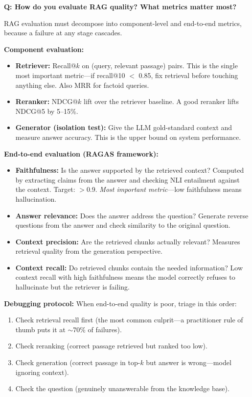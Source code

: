 \begin{interviewq}
\textbf{Q: How do you evaluate RAG quality? What metrics matter most?}

 \quad {} \quad \badgefreq{\freqhigh}

\stronganswer

RAG evaluation must decompose into component-level and end-to-end metrics, because a failure at any stage cascades.

\textbf{Component evaluation:}
\begin{itemize}
    \item \textbf{Retriever:} Recall@$k$ on (query, relevant passage) pairs. This is the single most important metric---if recall@10 $<$ 0.85, fix retrieval before touching anything else. Also MRR for factoid queries.
    \item \textbf{Reranker:} NDCG@$k$ lift over the retriever baseline. A good reranker lifts NDCG@5 by 5--15\%.
    \item \textbf{Generator (isolation test):} Give the LLM gold-standard context and measure answer accuracy. This is the upper bound on system performance.
\end{itemize}

\textbf{End-to-end evaluation (RAGAS framework):}
\begin{itemize}
    \item \textbf{Faithfulness:} Is the answer supported by the retrieved context? Computed by extracting claims from the answer and checking NLI entailment against the context. Target: $>$0.9. \textit{Most important metric}---low faithfulness means hallucination.
    \item \textbf{Answer relevance:} Does the answer address the question? Generate reverse questions from the answer and check similarity to the original question.
    \item \textbf{Context precision:} Are the retrieved chunks actually relevant? Measures retrieval quality from the generation perspective.
    \item \textbf{Context recall:} Do retrieved chunks contain the needed information? Low context recall with high faithfulness means the model correctly refuses to hallucinate but the retriever is failing.
\end{itemize}

\textbf{Debugging protocol:} When end-to-end quality is poor, triage in this order:
\begin{enumerate}
    \item Check retrieval recall first (the most common culprit---a practitioner rule of thumb puts it at $\sim$70\% of failures).
    \item Check reranking (correct passage retrieved but ranked too low).
    \item Check generation (correct passage in top-$k$ but answer is wrong---model ignoring context).
    \item Check the question (genuinely unanswerable from the knowledge base).
\end{enumerate}


\end{interviewq}
